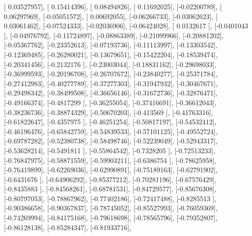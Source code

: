 \documentclass{article}
\begin{document}
       [ 0.03527957],
       [ 0.15414396],
       [ 0.08494826],
       [ 0.11692025],
       [-0.02200789],
       [ 0.06297969],
       [-0.05051572],
       [ 0.00692055],
       [-0.06266733],
       [-0.03062623],
       [ 0.03061462],
       [-0.07524333],
       [-0.02036906],
       [-0.06424028],
       [ 0.0132617 ],
       [-0.0401043 ],
       [-0.04976792],
       [-0.11724897],
       [-0.08863389],
       [-0.21099966],
       [-0.20881202],
       [-0.05367762],
       [-0.23352613],
       [-0.07193736],
       [-0.11113997],
       [-0.13303542],
       [-0.12369485],
       [-0.26280021],
       [-0.13679651],
       [-0.15422204],
       [-0.18539474],
       [-0.20341456],
       [-0.2132176 ],
       [-0.23003044],
       [-0.18831162],
       [-0.29698033],
       [-0.36999593],
       [-0.20196708],
       [-0.26707672],
       [-0.23840277],
       [-0.25371784],
       [-0.27412983],
       [-0.40277789],
       [-0.37277303],
       [-0.31947932],
       [-0.30467671],
       [-0.29498342],
       [-0.38499508],
       [-0.36656146],
       [-0.31672736],
       [-0.32876471],
       [-0.49166374],
       [-0.4817299 ],
       [-0.36255054],
       [-0.37416691],
       [-0.36612043],
       [-0.38236736],
       [-0.38874329],
       [-0.50670203],
       [-0.413569  ],
       [-0.41763316],
       [-0.61822647],
       [-0.4357975 ],
       [-0.46251254],
       [-0.50817197],
       [-0.54532412],
       [-0.46196476],
       [-0.65842759],
       [-0.54839533],
       [-0.57101125],
       [-0.49552724],
       [-0.69787282],
       [-0.52380738],
       [-0.58498746],
       [-0.52239049],
       [-0.52943317],
       [-0.53628214],
       [-0.5491811 ],
       [-0.55864542],
       [-0.7328205 ],
       [-0.72513233],
       [-0.76847975],
       [-0.58871559],
       [-0.59903211],
       [-0.6386754 ],
       [-0.78625958],
       [-0.76419899],
       [-0.62269036],
       [-0.62990891],
       [-0.75189163],
       [-0.62791902],
       [-0.6431676 ],
       [-0.64906292],
       [-0.85377212],
       [-0.70281196],
       [-0.67576429],
       [-0.8435883 ],
       [-0.84568261],
       [-0.68781531],
       [-0.84729577],
       [-0.85676308],
       [-0.80797053],
       [-0.78867962],
       [-0.77402186],
       [-0.72417488],
       [-0.8285513 ],
       [-0.90386658],
       [-0.90367837],
       [-0.78745052],
       [-0.85527993],
       [-0.76059369],
       [-0.74269994],
       [-0.84175168],
       [-0.79618698],
       [-0.78565796],
       [-0.79352807],
       [-0.86128138],
       [-0.85284347],
       [-0.81933716],
\end{document}
